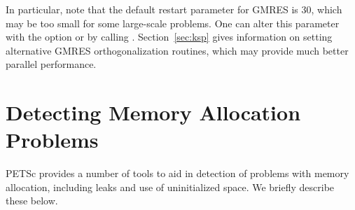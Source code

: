 In particular, note that the default restart parameter for GMRES is
30, which may be too small for some large-scale problems.  One can alter this
parameter with the option   or by
calling . Section~\ref{sec:ksp} gives
information on setting alternative GMRES orthogonalization routines,
which may provide much better parallel performance.

\section{Detecting Memory Allocation Problems}

PETSc provides a number of tools to aid in detection of problems
with memory allocation, including leaks and use of uninitialized space.
We briefly describe these below.
 

